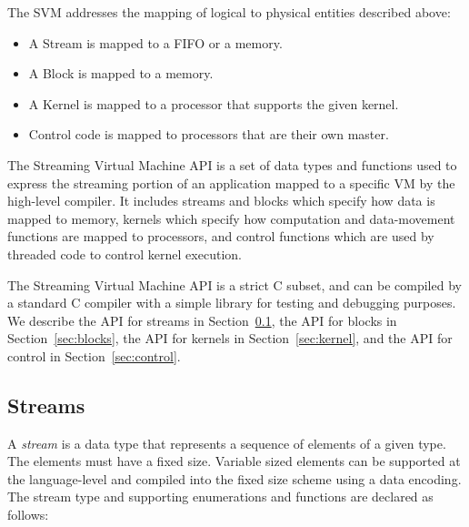 
The SVM addresses the mapping of logical to physical entities
described above:

\begin{itemize}

\item A Stream is mapped to a FIFO or a memory.

\item A Block is mapped to a memory.

\item A Kernel is mapped to a processor that supports the given kernel.

\item Control code is mapped to processors that are their own master.

\end{itemize}


The Streaming Virtual Machine API is a set of data types and functions
used to express the streaming portion of an application mapped to a
specific VM by the high-level compiler. It includes streams and blocks
which specify how data is mapped to memory, kernels which specify how
computation and data-movement functions are mapped to processors, and
control functions which are used by threaded code to control kernel
execution.

The Streaming Virtual Machine API is a strict C subset, and can be
compiled by a standard C compiler with a simple library for testing
and debugging purposes.  We describe the API for streams in
Section~\ref{sec:streams}, the API for blocks in
Section~\ref{sec:blocks}, the API for kernels in
Section~\ref{sec:kernel}, and the API for control in
Section~\ref{sec:control}.

\subsection{Streams}
\label{sec:streams}

A {\it stream} is a data type that represents a sequence of elements
of a given type.  The elements must have a fixed size. Variable sized
elements can be supported at the language-level and compiled into the
fixed size scheme using a data encoding. The stream type and
supporting enumerations and functions are declared as follows:

